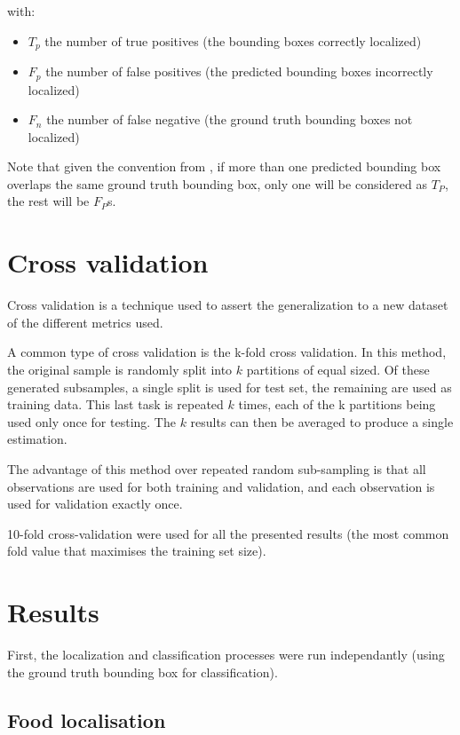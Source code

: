 with:
\begin{itemize}
   \item $T_p$ the number of true positives (the bounding boxes correctly localized)
   \item $F_p$ the number of false positives (the predicted bounding boxes incorrectly localized)
   \item $F_n$ the number of false negative (the ground truth bounding boxes not localized)
\end{itemize}

Note that given the convention from \cite{pascalVoc2012}, if more than one predicted bounding box overlaps the same ground truth bounding box, only one will be considered as $T_P$, the rest will be $F_P$s.

\section{Cross validation}

Cross validation is a technique used to assert the generalization to a new dataset of the different metrics used. 

A common type of cross validation is the k-fold cross validation. In this method, the  original sample is randomly split into $k$ partitions of equal sized. Of these generated subsamples, a single split is used for test set, the remaining are used as training data.
This last task is repeated $k$ times, each of the k partitions being used only once for testing. The $k$ results can then be averaged to produce a single estimation. 

The advantage of this method over repeated random sub-sampling is that all observations are used for both training and validation, and each observation is used for validation exactly once. 

10-fold cross-validation were used for all the presented results (the most common fold value that maximises the training set size).

\section{Results}

First, the localization and classification processes were run independantly (using the ground truth bounding box for classification).

\subsection{Food localisation}

